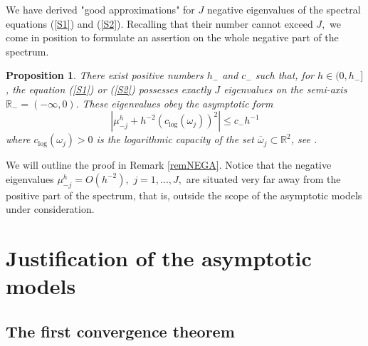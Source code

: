 \documentclass[11pt]{article}%
\newtheorem{proposition}[theorem]{Proposition}
\numberwithin{equation}{section}
\begin{document}
We have derived "good approximations" for $J$ negative eigenvalues of the
spectral equations (\ref{S1}) and (\ref{S2}). Recalling that their number
cannot exceed $J,$ we come in position to formulate an assertion on the whole
negative part of the spectrum.

\begin{proposition}
\label{prop11S}There exist positive numbers $h_{-}$ and $c_{-}$ such that, for
$h\in(0,h_{-}]$, the equation (\ref{S1}) or (\ref{S2}) possesses exactly $J$
eigenvalues on the semi-axis $\mathbb{R}_{-}=(-\infty,0).$ These eigenvalues
obey the asymptotic form%
\begin{equation}
|\mu_{-j}^{h}+h^{-2}(c_{\log}(\omega_{j}))^{2}|\leq c_{-}h^{-1} \label{S10}%
\end{equation}
where $c_{\log}(\omega_{j})>0$ is the logarithmic capacity of the set
$\overline{\omega}_{j}\subset\mathbb{R}^{2}$, see \cite{PoSe, Land}.
\end{proposition}

We will outline the proof in Remark \ref{remNEGA}. Notice that the negative
eigenvalues $\mu_{-j}^{h}=O(h^{-2}),$ $j=1,...,J,$ are situated very far away
from the positive part of the spectrum, that is, outside the scope of the
asymptotic models under consideration.

\section{Justification of the asymptotic models\label{sect4}}

\subsection{The first convergence theorem\label{sect4.1}}
\end{document}
